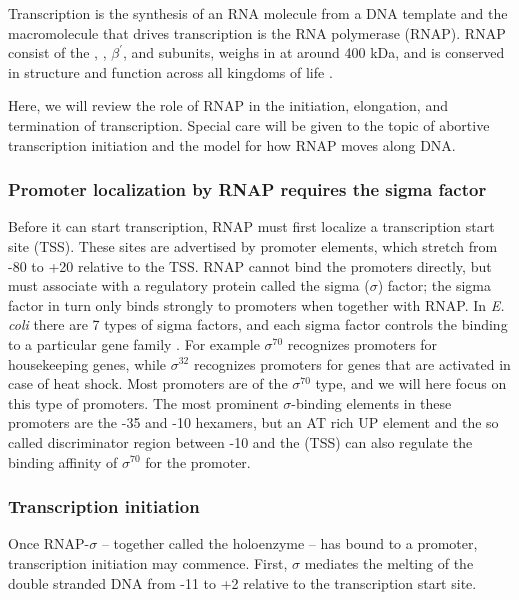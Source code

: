 %
%
Transcription is the synthesis of an RNA molecule from a DNA template and the
macromolecule that drives transcription is the RNA polymerase (RNAP). RNAP
consist of the , , \beta $\beta^{\prime}$, and \omega subunits,
weighs in at around 400 kDa, and is conserved in structure and function across
all kingdoms of life \cite{borukhov_rna_2008}.

Here, we will review the role of RNAP in the initiation, elongation, and
termination of transcription. Special care will be given to the topic of
abortive transcription initiation and the model for how RNAP moves along DNA.

\subsubsection{Promoter localization by RNAP requires the sigma factor}
Before it can start transcription, RNAP must first localize a transcription
start site (TSS). These sites are advertised by promoter elements, which
stretch from -80 to +20 relative to the TSS. RNAP cannot bind the promoters
directly, but must associate with a regulatory protein called the sigma
($\sigma$) factor; the sigma factor in turn only binds strongly to promoters
when together with RNAP. In \textit{E. coli} there are 7 types of sigma
factors, and each sigma factor controls the binding to a particular gene family
\cite{osterberg_regulation_2011}. For example $\sigma^{70}$ recognizes
promoters for housekeeping genes, while $\sigma^{32}$ recognizes promoters for
genes that are activated in case of heat shock. Most promoters are of the
$\sigma^{70}$ type, and we will here focus on this type of promoters.
The most prominent $\sigma$-binding elements in these promoters are the -35 and
-10 hexamers, but an AT rich UP element and the so called discriminator region
between -10 and the (TSS) can also regulate the binding affinity of
$\sigma^{70}$ for the promoter.

\subsubsection{Transcription initiation}
Once RNAP-$\sigma$ -- together called the holoenzyme --  has bound to a
promoter, transcription initiation may commence. First, $\sigma$ mediates the
melting of the double stranded DNA from -11 to +2 relative to the transcription
start site.

